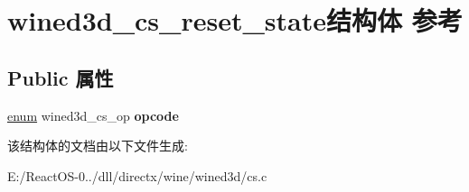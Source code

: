 \hypertarget{structwined3d__cs__reset__state}{}\section{wined3d\+\_\+cs\+\_\+reset\+\_\+state结构体 参考}
\label{structwined3d__cs__reset__state}
\subsection*{Public 属性}
\begin{DoxyCompactItemize}
\item 
\mbox{\label{structwined3d__cs__reset__state_a87afda7112f0521e1ab11cdc34a7d25a}} 
\hyperlink{interfaceenum}{enum} wined3d\+\_\+cs\+\_\+op {\bfseries opcode}
\end{DoxyCompactItemize}


该结构体的文档由以下文件生成\+:\begin{DoxyCompactItemize}
\item 
E\+:/\+React\+O\+S-\/0../dll/directx/wine/wined3d/cs.\+c\end{DoxyCompactItemize}
